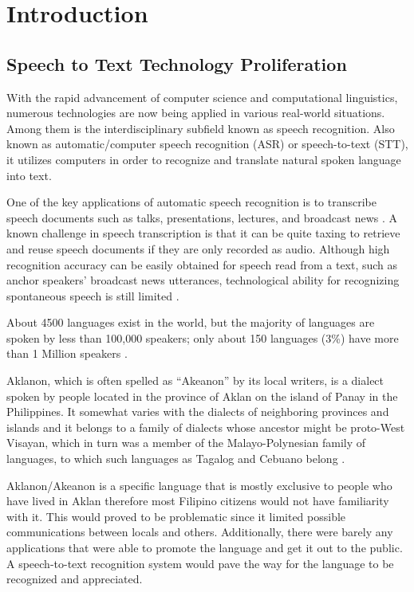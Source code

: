 \chapter{Introduction}

\section{Speech to Text Technology Proliferation}

With the rapid advancement of computer science and computational linguistics, numerous technologies are now being applied in various real-world situations. Among them is the interdisciplinary subfield known as speech recognition. Also known as automatic/computer speech recognition (ASR) or speech-to-text (STT), it utilizes computers in order to recognize and translate natural spoken language into text.

One of the key applications of automatic speech recognition is to transcribe speech documents such as talks, presentations, lectures, and broadcast news \cite{furui2004speech}. A known challenge in speech transcription is that it can be quite taxing to retrieve and reuse speech documents if they are only recorded as audio. Although high recognition accuracy can be easily obtained for speech read from a text, such as anchor speakers’ broadcast news utterances, technological ability for recognizing spontaneous speech is still limited \cite{furui2004speech}.

About 4500 languages exist in the world, but the majority of languages are spoken by less than 100,000 speakers; only about 150 languages (3\%) have more than 1 Million speakers \cite{schultz2002globalphone}.

Aklanon, which is often spelled as “Akeanon” by its local writers, is a dialect spoken by people located in the province of Aklan on the island of Panay in the Philippines. It somewhat varies with the dialects of neighboring provinces and islands and it belongs to a family of dialects whose ancestor might be proto-West Visayan, which in turn was a member of the Malayo-Polynesian family of languages, to which such languages as Tagalog and Cebuano belong \cite{de1968study}.

Aklanon/Akeanon is a specific language that is mostly exclusive to people who have lived in Aklan therefore most Filipino citizens would not have familiarity with it. This would proved to be problematic since it limited possible communications between locals and others. Additionally, there were barely any applications that were able to promote the language and get it out to the public. A speech-to-text recognition system would pave the way for the language to be recognized and appreciated.

